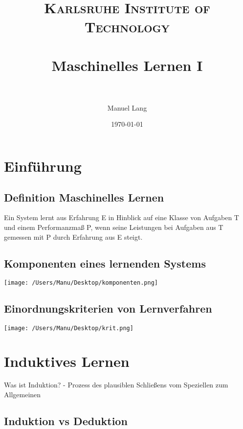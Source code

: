 \documentclass[paper=a4, fontsize=11pt]{scrartcl} %
\title{	
\normalfont \normalsize 
\textsc{Karlsruhe Institute of Technology} \\ [25pt] %
\horrule{0.5pt} \\[0.4cm] %
\huge Maschinelles Lernen I\\ %
\horrule{2pt} \\[0.5cm] %
}
\author{Manuel Lang} %
\date{\normalsize\today} %
\numberwithin{equation}{section} %
\numberwithin{figure}{section} %
\numberwithin{table}{section} %
\begin{document}
{\small\tableofcontents}
\newpage

\maketitle %


\section{Einführung}

\subsection{Definition Maschinelles Lernen}

Ein System lernt aus Erfahrung E in Hinblick auf eine Klasse von Aufgaben T und einem Performanzmaß P, wenn seine Leistungen bei Aufgaben aus T gemessen mit P durch Erfahrung aus E steigt.

\subsection{Komponenten eines lernenden Systems}

\texttt{[image: /Users/Manu/Desktop/komponenten.png]}

\subsection{Einordnungskriterien von Lernverfahren}

\texttt{[image: /Users/Manu/Desktop/krit.png]}

\section{Induktives Lernen}

Was ist Induktion? - Prozess des plausiblen Schließens vom Speziellen zum Allgemeinen

\subsection{Induktion vs Deduktion}
\end{document}
